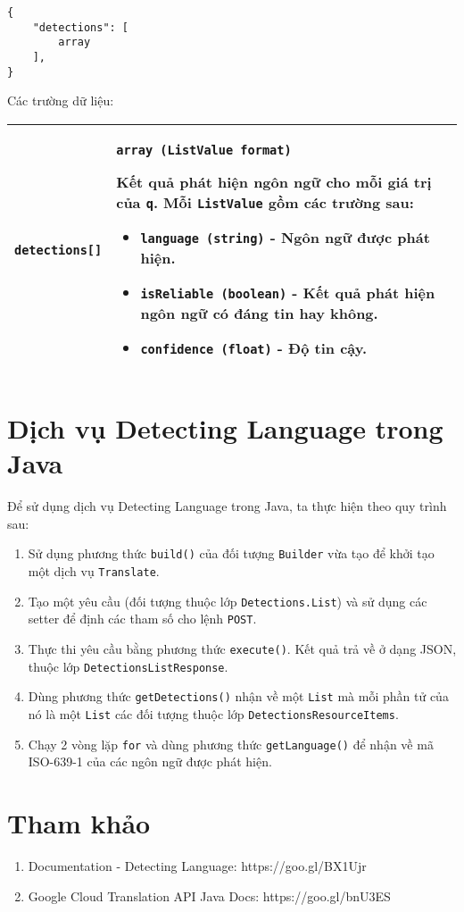 \documentclass[../thesis.tex]{subfiles}
\begin{document}
\begin{lstlisting}[style=link]
{
	"detections": [
		array
	],
}
\end{lstlisting}

Các trường dữ liệu:
\begin{center}
\begin{tabularx}{\textwidth}{|p{}|X|}
\hline
\lstinline{detections[]} & \lstinline{array (ListValue format)}

Kết quả phát hiện ngôn ngữ cho mỗi giá trị của \lstinline{q}. Mỗi \lstinline{ListValue} gồm các trường sau:

\begin{itemize}
  \item \lstinline{language (string)} - Ngôn ngữ được phát hiện.
  \item \lstinline{isReliable (boolean)} - Kết quả phát hiện ngôn ngữ có đáng tin hay không.
  \item \lstinline{confidence (float)} - Độ tin cậy.
\end{itemize}
\\
\hline
\end{tabularx}
\end{center}

\section{Dịch vụ Detecting Language trong Java}
Để sử dụng dịch vụ Detecting Language trong Java, ta thực hiện theo quy trình sau:
\begin{enumerate}
  \item Sử dụng phương thức \lstinline{build()} của đối tượng \lstinline{Builder} vừa tạo để khởi tạo một dịch vụ \lstinline{Translate}.
  \item Tạo một yêu cầu (đối tượng thuộc lớp \lstinline{Detections.List}) và sử dụng các setter để định các tham số cho lệnh \lstinline{POST}.
  \item Thực thi yêu cầu bằng phương thức \lstinline{execute()}. Kết quả trả về ở dạng JSON, thuộc lớp \lstinline{DetectionsListResponse}.
  \item Dùng phương thức \lstinline{getDetections()} nhận về một \lstinline{List} mà mỗi phần tử của nó là một \lstinline{List} các đối tượng thuộc lớp \lstinline{DetectionsResourceItems}.
  \item Chạy 2 vòng lặp \lstinline{for} và dùng phương thức \lstinline{getLanguage()} để nhận về mã ISO-639-1 của các ngôn ngữ được phát hiện.
\end{enumerate}

\section*{Tham khảo}

\begin{enumerate}
  \item Documentation - Detecting Language: https://goo.gl/BX1Ujr
  \item Google Cloud Translation API Java Docs: https://goo.gl/bnU3ES
\end{enumerate}
\end{document}
